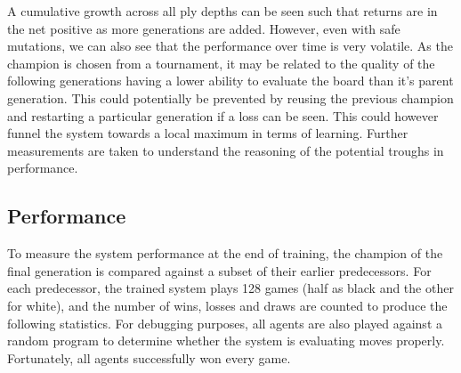 \documentclass[12pt,a4paper]{article}
\begin{document}
    A cumulative growth across all ply depths can be seen such that returns are in the net positive as more generations are added. However, even with safe mutations, we can also see that the performance over time is very volatile.
     As the champion is chosen from a tournament, it may be related to the quality of the following generations having a lower ability to evaluate the board than it's parent generation. 
     This could potentially be prevented by reusing the previous champion and restarting a particular generation if a loss can be seen. This could however funnel the system towards a local maximum in terms of learning. Further measurements are taken to understand the reasoning of the potential troughs in performance. 
    
    \subsection{Performance}
    To measure the system performance at the end of training, the champion of the final generation is compared against a subset of their earlier predecessors. For each predecessor, the trained system plays 128 games (half as black and the other for white), and the number of wins, losses and draws are counted to produce the following statistics. For debugging purposes, all agents are also played against a random program to determine whether the system is evaluating moves properly. Fortunately, all agents successfully won every game.
\end{document}
